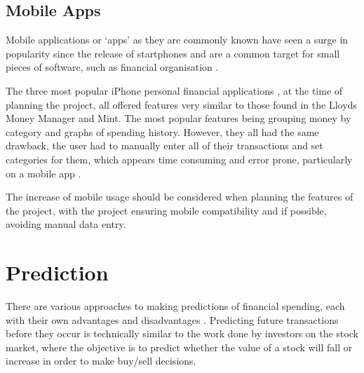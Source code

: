\subsection{Mobile Apps}
Mobile applications or `apps' as they are commonly known have seen a surge in popularity since the release of startphones and are a common target for small pieces of software, such as financial organisation \parencite{purcell2011half}.

The three most popular iPhone personal financial applications \cite{itunes2013topapps}, at the time of planning the project, all offered features very similar to those found in the Lloyds Money Manager and Mint. The most popular features being grouping money by \gls{category} and graphs of spending history.
% 
However, they all had the same drawback, the user had to manually enter all of their transactions and set categories for them, which appears time consuming and error prone, particularly on a mobile app \cite{spendee2014spendee,budgt2013budgt,bluetags2014pocket}.

The increase of mobile usage should be considered when planning the features of the project, with the project ensuring mobile compatibility and if possible, avoiding manual data entry. 

\section{Prediction}

There are various approaches to making predictions of financial spending, each with their own advantages and disadvantages . Predicting future transactions before they occur is technically similar to the work done by investors on the stock market, where the objective is to predict whether the value of a stock will fall or increase in order to make buy/sell decisions.

